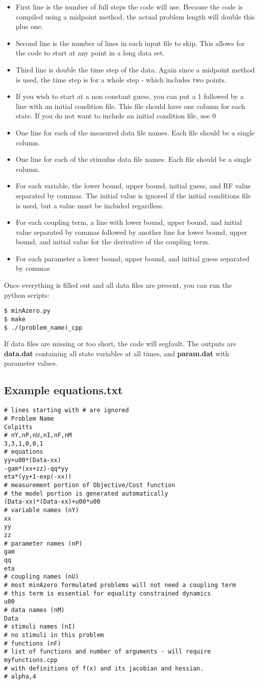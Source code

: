 \documentclass{scrartcl}
\newcommand{\bi}{\begin{itemize}}
\newcommand{\ei}{\end{itemize}}
\begin{document}
\bi
\item First line is the number of full steps the code will use.  Because the code is compiled using a midpoint method, the actual problem length will double this plus one.
\item Second line is the number of lines in each input file to skip.  This allows for the code to start at any point in a long data set.
\item Third line is double the time step of the data.  Again since a midpoint method is used, the time step is for a whole step - which includes two points.
\item If you wish to start at a non constant guess, you can put a 1 followed by a line with an initial condition file.  This file should have one column for each state.  If you do not want to include an initial condition file, use 0
\item One line for each of the measured data file names.  Each file should be a single column.
\item One line for each of the stimulus data file names.  Each file should be a single column.
\item For each variable, the lower bound, upper bound, initial guess, and RF value separated by commas.  The initial value is ignored if the initial conditions file is used, but a value must be included regardless.
\item For each coupling term, a line with lower bound, upper bound, and initial value separated by commas followed by another line for lower bound, upper bound, and initial value for the derivative of the coupling term.
\item For each parameter a lower bound, upper bound, and initial guess separated by commas
\ei
Once everything is filled out and all data files are present, you can run the python scripts:
\begin{verbatim}
$ minAzero.py
$ make
$ ./(problem_name)_cpp
\end{verbatim}
If data files are missing or too short, the code will segfault.  The outputs are {\bf data.dat} containing all state variables at all times, and {\bf param.dat} with parameter values.


\pagebreak
\subsection*{Example equations.txt}
\begin{verbatim}
# lines starting with # are ignored
# Problem Name
Colpitts
# nY,nP,nU,nI,nF,nM
3,3,1,0,0,1
# equations
yy+u00*(Data-xx)
-gam*(xx+zz)-qq*yy
eta*(yy+1-exp(-xx))
# measurement portion of Objective/Cost function 
# the model portion is generated automatically
(Data-xx)*(Data-xx)+u00*u00
# variable names (nY)
xx
yy
zz
# parameter names (nP)
gam
qq
eta
# coupling names (nU)
# most minAzero formulated problems will not need a coupling term
# this term is essential for equality constrained dynamics
u00
# data names (nM)
Data
# stimuli names (nI)
# no stimuli in this problem
# functions (nF)
# list of functions and number of arguments - will require myfunctions.cpp
# with definitions of f(x) and its jacobian and hessian.
# alpha,4
\end{verbatim}
\pagebreak
\end{document}
